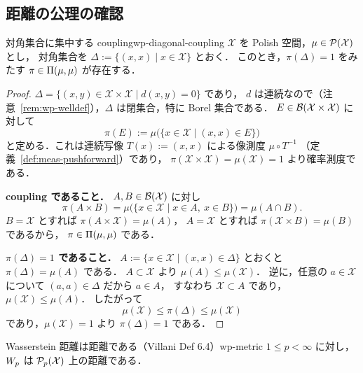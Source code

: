 \subsection{距離の公理の確認}

\begin{proposition}{対角集合に集中する coupling}{wp-diagonal-coupling}
  $\mathcal{X}$ を Polish 空間，$\mu\in\mathcal{P}(\mathcal{X})$ とし，
  対角集合を $\Delta:=\{(x,x)\mid x\in\mathcal{X}\}$ とおく．
  このとき，$\pi(\Delta)=1$ をみたす $\pi\in\Pi(\mu,\mu)$ が存在する．
\end{proposition}

\begin{proof}
  $\Delta=\{(x,y)\in\mathcal{X}\times\mathcal{X}\mid d(x,y)=0\}$ であり，
  $d$ は連続なので（注意~\ref{rem:wp-welldef}），$\Delta$ は閉集合，特に Borel 集合である．
  $E\in\mathcal{B}(\mathcal{X}\times\mathcal{X})$ に対して
  \[
    \pi(E):=\mu\bigl(\{x\in\mathcal{X}\mid(x,x)\in E\}\bigr)
  \]
  と定める．これは連続写像 $T(x):=(x,x)$ による像測度 $\mu\circ T^{-1}$
  （定義~\ref{def:meas-pushforward}）であり，
  $\pi(\mathcal{X}\times\mathcal{X})=\mu(\mathcal{X})=1$ より確率測度である．

  \textbf{coupling であること．}
  $A,B\in\mathcal{B}(\mathcal{X})$ に対し
  \[
    \pi(A\times B)
    =\mu\bigl(\{x\in\mathcal{X}\mid x\in A,\ x\in B\}\bigr)
    =\mu(A\cap B).
  \]
  $B=\mathcal{X}$ とすれば $\pi(A\times\mathcal{X})=\mu(A)$，
  $A=\mathcal{X}$ とすれば $\pi(\mathcal{X}\times B)=\mu(B)$ であるから，
  $\pi\in\Pi(\mu,\mu)$ である．

  \textbf{$\pi(\Delta)=1$ であること．}
  $A:=\{x\in\mathcal{X}\mid(x,x)\in\Delta\}$ とおくと $\pi(\Delta)=\mu(A)$ である．
  $A\subset\mathcal{X}$ より $\mu(A)\leq\mu(\mathcal{X})$．
  逆に，任意の $a\in\mathcal{X}$ について $(a,a)\in\Delta$ だから $a\in A$，
  すなわち $\mathcal{X}\subset A$ であり，$\mu(\mathcal{X})\leq\mu(A)$．
  したがって
  \[
    \mu(\mathcal{X})\leq\pi(\Delta)\leq\mu(\mathcal{X})
  \]
  であり，$\mu(\mathcal{X})=1$ より $\pi(\Delta)=1$ である．
\end{proof}

\begin{proposition}{Wasserstein 距離は距離である（Villani Def 6.4）}{wp-metric}
  $1\leq p<\infty$ に対し，
  $W_p$ は $\mathcal{P}_{p}(\mathcal{X})$ 上の距離である．
\end{proposition}

